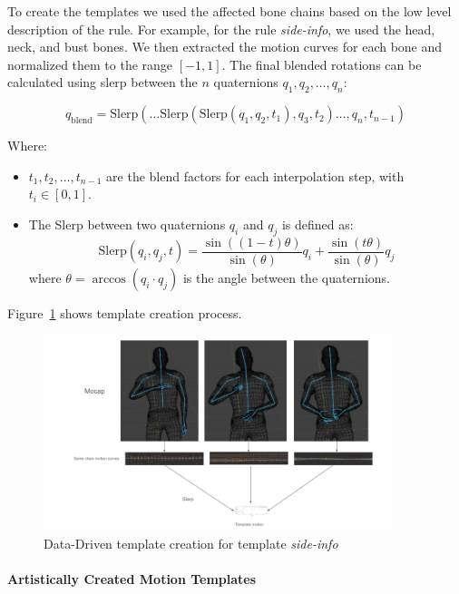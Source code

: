 \documentclass[../../main.tex]{subfiles}
\begin{document}
To create the templates we used the affected bone chains based on the low level description of the rule. For example, for the rule \emph{side-info}, we used the head, neck, and bust bones. We then extracted the motion curves for each bone and normalized them to the range \([-1, 1]\). The final blended rotations can be calculated using \gls{slerp} between the \( n \) quaternions \( q_1, q_2, \dots, q_n \):

\[
q_{\text{blend}} = \text{Slerp}\left(\dots \text{Slerp}\left(\text{Slerp}(q_1, q_2, t_1), q_3, t_2 \right) \dots , q_n, t_{n-1} \right)
\]

Where:
\begin{itemize}
    \item \( t_1, t_2, \dots, t_{n-1} \) are the blend factors for each interpolation step, with \( t_i \in [0, 1] \).
    \item The Slerp between two quaternions \( q_i \) and \( q_j \) is defined as:
    \[
    \text{Slerp}(q_i, q_j, t) = \frac{\sin((1-t)\theta)}{\sin(\theta)} q_i + \frac{\sin(t\theta)}{\sin(\theta)} q_j
    \]
    where \( \theta = \arccos(q_i \cdot q_j) \) is the angle between the quaternions.
\end{itemize}

Figure~\ref{fig:motion_curves_datadriven} shows template creation process.

\begin{figure}
    \centering \includegraphics[width = 4in]{chapters/intermediate_blocks_pose_correction/images/motion_curves_template_datadriven.png}
    \caption{Data-Driven template creation for template \emph{side-info}}
    \label{fig:motion_curves_datadriven}
\end{figure}

\paragraph{Artistically Created Motion Templates}
\label{ch:intermediate_blocks_pose_correction:creating_motion_templates:artisitic}
\end{document}
